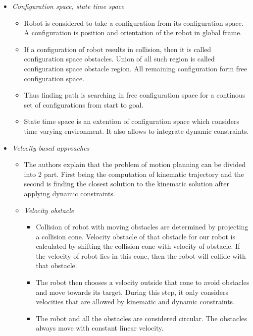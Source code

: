 \documentclass[12pt]{article}
\begin{document}
\begin{itemize}
\begin{itemize}
\begin{itemize}
        \end{itemize}
        \item \textit{Configuration space, state time space}
        \begin{itemize}
            \item Robot is considered to take a configuration from its configuration space. A configuration is position and orientation of the robot in global frame.
            \item If a configuration of robot results in collision, then it is called configuration space obstacles. Union of all such region is called configuration space obstacle region. All remaining configuration form free configuration space.
            \item Thus finding path is searching in free configuration space for a continous set of configurations from start to goal.
            \item State time space is an extention of configuration space which considers time varying environment. It also allows to integrate dynamic constraints.
        \end{itemize}
        \item \textit{Velocity based approaches}
        \begin{itemize}
            \item The authors explain that the problem of motion planning can be divided into 2 part. First being the computation of kinematic trajectory and the second is finding the closest solution to the kinematic solution after applying dynamic constraints.
            \item \textit{Velocity obstacle}
            \begin{itemize}
                \item Collision of robot with moving obstacles are determined by projecting a collision cone. Velocity obstacle of that obstacle for our robot is calculated by shifting the collision cone with velocity of obstacle. If the velocity of robot lies in this cone, then the robot will collide with that obstacle.
                \item The robot then chooses a velocity outside that cone to avoid obstacles and move towards its target. During this step, it only considers velocities that are allowed by kinematic and dynamic constraints.
                \item The robot and all the obstacles are considered circular. The obstacles always move with constant linear velocity.
            \end{itemize}

\end{itemize}
\end{itemize}
\end{itemize}
\end{document}
